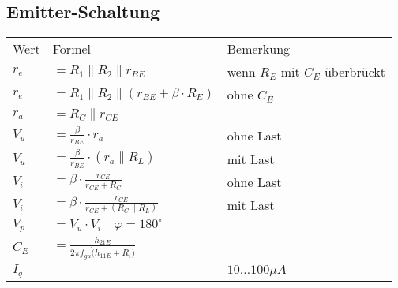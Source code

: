 \subsection{Emitter-Schaltung}
    \renewcommand{\arraystretch}{0.9}
    \begin{table}[H]
        \begin{tabularx}{\columnwidth}{l l l}
            Wert  & Formel                                                  & Bemerkung \\
            $r_e$ & $=R_1\parallel R_2\parallel r_{BE}$                     & wenn $R_E$ mit $C_E$ überbrückt \\
            $r_e$ & $=R_1\parallel R_2\parallel (r_{BE}+\beta\cdot R_E)$    & ohne $C_E$ \\
            $r_a$ & $=R_C\parallel r_{CE}$                                  & \\
            $V_u$ & $=\frac{\beta}{r_{BE}}\cdot r_a$                        & ohne Last \\
            $V_u$ & $=\frac{\beta}{r_{BE}}\cdot (r_a\parallel R_L)$         & mit Last \\
            $V_i$ & $=\beta\cdot\frac{r_{CE}}{r_{CE}+R_C}$                  & ohne Last \\
            $V_i$ & $=\beta\cdot\frac{r_{CE}}{r_{CE}+(R_C\parallel R_L)}$   & mit Last \\
            $V_p$ & $=V_u\cdot V_i\quad \varphi=180^{\circ}$                & \\ %
            $C_E$ & $=\frac{h_{21E}}{2\pi f_{gu}\dot (h_{11E}+R_i)}$        & \\
            $I_q$ &                                                         & $10\dots100\mu A$\\
        \end{tabularx}
    \end{table}
